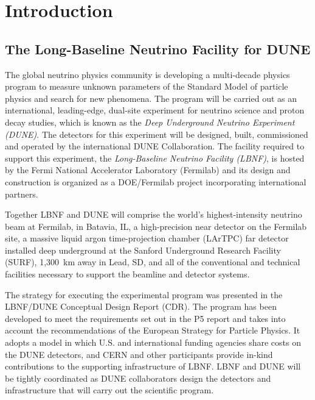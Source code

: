 \chapter{Introduction}
\label{ch:fscf-intro}


\section{The Long-Baseline Neutrino Facility for DUNE}
\label{sec:pdr-volumes-fscf}

The global neutrino physics community is developing a multi-decade physics program to measure unknown parameters of the Standard Model of particle physics and search for new phenomena. The program will be carried out as an international, leading-edge, dual-site experiment for neutrino science and proton decay studies, which is known as the \textit{Deep Underground Neutrino Experiment (DUNE)}. The detectors for this experiment will be designed, built, commissioned and operated by the international DUNE Collaboration. The facility required to support this experiment, the \textit{Long-Baseline Neutrino Facility (LBNF)}, is hosted by the Fermi National Accelerator Laboratory (Fermilab) and its design and construction is organized as a DOE/Fermilab project incorporating international partners.

Together LBNF and DUNE will comprise the world's highest-intensity neutrino beam at Fermilab, in Batavia, IL, a high-precision near detector on the Fermilab site, a massive liquid argon time-projection chamber (LArTPC) far detector installed deep underground at the Sanford Underground Research Facility (SURF), 1,300~km away in Lead, SD, and all of the conventional and technical facilities necessary to support the beamline and detector systems.

The strategy for executing the experimental program was presented in the LBNF/DUNE Conceptual Design Report (CDR)\cite{cd-1-r-cdr}. The program has been developed to meet the requirements set out in the P5 report \cite{p5report2014} and takes into account the recommendations of the European Strategy for Particle Physics\cite{euro-strat-2013}. It adopts a model in which U.S. and international funding agencies share costs on the DUNE detectors, and CERN and other participants provide in-kind contributions to the supporting infrastructure of LBNF. LBNF and DUNE will be tightly coordinated as DUNE collaborators design the detectors and infrastructure that will carry out the scientific program.

